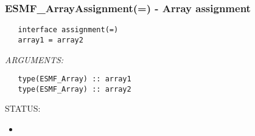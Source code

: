  
\setlength{\oldparskip}{\parskip}
\setlength{\parskip}{1.5ex}
\setlength{\oldparindent}{\parindent}
\setlength{\parindent}{0pt}
\setlength{\oldbaselineskip}{\baselineskip}
\setlength{\baselineskip}{11pt}
 
\def\bv{\begin{verbatim}}
\def\ev{\end{verbatim}}
\def\be{\begin{equation}}
\def\ee{\end{equation}}
\def\bea{\begin{eqnarray}}
\def\eea{\end{eqnarray}}
\def\bi{\begin{itemize}}
\def\ei{\end{itemize}}
\def\bn{\begin{enumerate}}
\def\en{\end{enumerate}}
\def\bd{\begin{description}}
\def\ed{\end{description}}
\def\({\left (}
\def\){\right )}
\def\[{\left [}
\def\]{\right ]}
\def\<{\left  \langle}
\def\>{\right \rangle}
\def\cI{{\cal I}}
\def\diag{\mathop{\rm diag}}
\def\tr{\mathop{\rm tr}}


 
\subsubsection [ESMF\_ArrayAssignment(=)] {ESMF\_ArrayAssignment(=) - Array assignment}


  
\begin{verbatim}   interface assignment(=)
   array1 = array2\end{verbatim}{\em ARGUMENTS:}
\begin{verbatim}   type(ESMF_Array) :: array1
   type(ESMF_Array) :: array2\end{verbatim}
{\sf STATUS:}
   \begin{itemize}
   \item{}
   \end{itemize}
  

